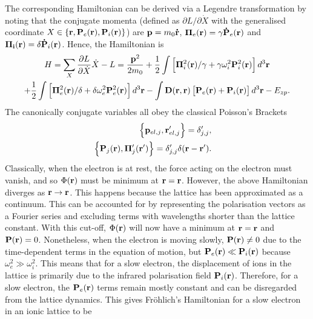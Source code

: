 The corresponding Hamiltonian can be derived via a Legendre transformation by noting that the conjugate momenta (defined as $\partial L/\partial\dot{X}$ with the generalised coordinate $X \in \{\vb{r},  \vb{P}_e(\vb{r}), \vb{P}_i(\vb{r})\}$) are $\vb{p} = m_0 \vb{\dot{r}}$, $\vb{\Pi}_e(\vb{r}) = \gamma \vb{\dot{P}}_e(\vb{r})$ and $\vb{\Pi_i(\vb{r})} = \delta \vb{\dot{P}}_i (\vb{r})$. Hence, the Hamiltonian is
\begin{equation}
    \begin{gathered}
        H = \sum_{X} \frac{\partial L}{\partial \dot{X}} \dot{X} - L = \frac{\vb{p}^2}{2 m_0} + \frac{1}{2} \int \left[\vb{\Pi}_{i}^2(\vb{r})/\gamma + \gamma\omega_{i}^2 \vb{P}^2_i (\vb{r}) \right]
        d^3 \vb{r} 
        \\ + \frac{1}{2} \int \left[\vb{\Pi}_{e}^2(\vb{r})/\delta + \delta\omega_{e}^2 \vb{P}^2_e (\vb{r}) \right] d^3 \vb{r} - \int \vb{D}(\vb{r},\vb{r})\left[\vb{P}_e(\vb{r})+\vb{P}_i(\vb{r})\right] d^3\vb{r} - E_{zp}.
    \end{gathered}
\label{eqn-2121-14}
\end{equation}
The canonically conjugate variables all obey the classical Poisson's Brackets
\begin{subequations}
\begin{align}
    \begin{split}
        \left\{\vb{p}_{el, j}, \vb{r}_{el, j}'\right\} &= \delta_{j, j}',
    \end{split}\\
    \begin{split}
        \left\{\vb{P}_{j}(\vb{r}), \vb{\Pi}_{j}'(\vb{r}')\right\} &= \delta_{j, j}' \delta(\vb{r}-\vb{r}').
    \end{split}
\end{align}
\label{eqn-2121-15}
\end{subequations}
Classically, when the electron is at rest, the force acting on the electron must vanish, and so $\Phi(\vb{r})$ must be minimum at $\vb{r} = \vb{r}$. However, the above Hamiltonian diverges as $\vb{r} \to \vb{r}$. This happens because the lattice has been approximated as a continuum. This can be accounted for by representing the polarisation vectors as a Fourier series and excluding terms with wavelengths shorter than the lattice constant. With this cut-off, $\Phi(\vb{r})$ will now have a minimum at $\vb{r} = \vb{r}$ and $\vb{P}(\vb{r}) = 0$. Nonetheless, when the electron is moving slowly, $\vb{P}(\vb{r}) \neq 0$ due to the time-dependent terms in the equation of motion, but $\vb{P}_e(\vb{r}) \ll \vb{P}_i(\vb{r})$ because $\omega^2_e \gg \omega^2_i$. This means that for a slow electron, the displacement of ions in the lattice is primarily due to the infrared polarisation field $\vb{P}_i(\vb{r})$. Therefore, for a slow electron, the $\vb{P}_e(\vb{r})$ terms remain mostly constant and can be disregarded from the lattice dynamics. This gives Fr\"ohlich's  Hamiltonian for a slow electron in an ionic lattice to be

